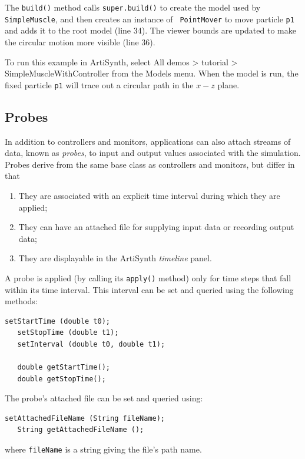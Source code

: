The {\tt build()} method calls {\tt super.build()} to create the model
used by {\tt SimpleMuscle}, and then creates an instance of {\tt
PointMover} to move particle {\tt p1} and adds it to the root model
(line 34). The viewer bounds are updated to make the circular motion
more visible (line 36).

To run this example in ArtiSynth, select {\sf All demos > tutorial >
SimpleMuscleWithController} from the {\sf Models} menu. When
the model is run, the fixed particle {\tt p1} will trace
out a circular path in the $x-z$ plane.

\subsection{Probes}
\label{Probes:sec}

In addition to controllers and monitors, applications can also attach
streams of data, known as {\it probes}, to input and output values
associated with the simulation. Probes derive from the same base class
 as 
controllers and monitors, 
but differ in that 

\begin{enumerate}

\item They are associated with an explicit time interval during which
they are applied;

\item They can have an attached file for supplying input data or
recording output data;

\item They are displayable in the ArtiSynth {\it timeline} panel.

\end{enumerate}

A probe is applied (by calling its {\tt apply()} method) only for time
steps that fall within its time interval. This interval can be set and
queried using the following methods:
%
\begin{lstlisting}[]
   setStartTime (double t0);
   setStopTime (double t1);
   setInterval (double t0, double t1);
 
   double getStartTime();
   double getStopTime();
\end{lstlisting}
%
The probe's attached file can be set and queried using:
%
\begin{lstlisting}[]
   setAttachedFileName (String fileName);
   String getAttachedFileName ();
\end{lstlisting}
%
where {\tt fileName} is a string giving the file's path name.

